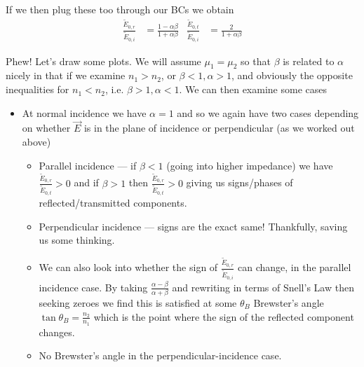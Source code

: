 \documentclass[10pt]{report}
\begin{document}
If we then plug these too through our BCs we obtain
\begin{align}
    \frac{\tilde{E}_{0,r}}{\tilde{E}_{0,i}} &= \frac{1 - \alpha \beta}{1 + \alpha \beta} & \frac{\tilde{E}_{0,t}}{\tilde{E}_{0,i}} &= \frac{2}{1 + \alpha \beta}
\end{align}

Phew! Let's draw some plots. We will assume $\mu_1 = \mu_2$ so that $\beta$ is related to $\alpha$ nicely in that if we examine $n_1 > n_2$, or $\beta < 1, \alpha > 1$, and obviously the opposite inequalities for $n_1 < n_2$, i.e. $\beta > 1, \alpha < 1$. We can then examine some cases
\begin{itemize}
    \item At normal incidence we have $\alpha = 1$ and so we again have two cases depending on whether $\vec{E}$ is in the plane of incidence or perpendicular (as we worked out above)
        \begin{itemize}
            \item Parallel incidence --- if $\beta < 1$ (going into higher impedance) we have $\frac{\tilde{E}_{0,r}}{\tilde{E}_{0,t}} > 0$ and if $\beta > 1$ then $\frac{\tilde{E}_{0,r}}{\tilde{E}_{0,t}} > 0$ giving us signs/phases of reflected/transmitted components.
            \item Perpendicular incidence --- signs are the exact same! Thankfully, saving us some thinking.
            \item We can also look into whether the sign of $\frac{\tilde{E}_{0,r}}{\tilde{E}_{0,i}}$ can change, in the parallel incidence case. By taking $\frac{\alpha - \beta}{\alpha + \beta}$ and rewriting in terms of Snell's Law then seeking zeroes we find this is satisfied at some $\theta_B$ Brewster's angle $\tan \theta_B = \frac{n_2}{n_1}$ which is the point where the sign of the reflected component changes.
            \item No Brewster's angle in the perpendicular-incidence case.
        \end{itemize}
\end{itemize}
\end{document}
